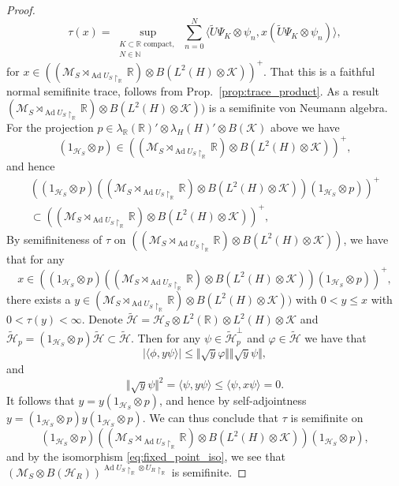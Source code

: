 \documentclass[sn-mathphys-num]{sn-jnl}%
\newcommand{\RR}{\mathbb{R}}
\newcommand{\HH}{\mathcal{H}}
\newcommand{\KK}{\mathcal{K}}
\newcommand{\MM}{\mathcal{M}}
\DeclareMathOperator{\Ad}{Ad}
\numberwithin{equation}{section}
\theoremstyle{thmstyleone}%
\theoremstyle{thmstyletwo}%
\theoremstyle{thmstylethree}%
\begin{document}
\begin{proof}
    \begin{equation}
        \tau(x)=\sup_{\substack{K\subset\RR\text{ compact, }\\N\in\mathbb{N}}}\sum_{n=0}^N\langle \tilde{U}\Psi_K\otimes\psi_n,x(\tilde{U}\Psi_K\otimes\psi_n)\rangle,
    \end{equation}
    for $x\in ((\MM_S\rtimes_{\Ad U_S\restriction_\RR}\RR)\otimes B(L^2(H)\otimes\KK))^+$. That this is a faithful normal semifinite trace, follows from Prop.\ \ref{prop:trace_product}. As a result $(\MM_S\rtimes_{\Ad U_S\restriction_\RR}\RR)\otimes B(L^2(H)\otimes\KK))$ is a semifinite von Neumann algebra. For the projection $p\in \lambda_\RR(\RR)'\otimes\lambda_H(H)'\otimes B(\KK)$ above we have 
    \begin{equation}
        (1_{\HH_S}\otimes p)\in ((\MM_S\rtimes_{\Ad U_S\restriction_\RR}\RR)\otimes B(L^2(H)\otimes\KK))^+,
    \end{equation}
    and hence
    \begin{multline}
    \label{eq:compression_positive}
        \left((1_{\HH_S}\otimes p)((\MM_S\rtimes_{\Ad U_S\restriction_\RR}\RR)\otimes B(L^2(H)\otimes\KK))(1_{\HH_S}\otimes p)\right)^+\\
        \subset ((\MM_S\rtimes_{\Ad U_S\restriction_\RR}\RR)\otimes B(L^2(H)\otimes\KK))^+,
    \end{multline}
    By semifiniteness of $\tau$ on $((\MM_S\rtimes_{\Ad U_S\restriction_\RR}\RR)\otimes B(L^2(H)\otimes\KK))$, we have that for any
    \begin{equation}
        x\in \left((1_{\HH_S}\otimes p)((\MM_S\rtimes_{\Ad U_S\restriction_\RR}\RR)\otimes B(L^2(H)\otimes\KK))(1_{\HH_S}\otimes p)\right)^+,
    \end{equation}
    there exists a $y\in (\MM_S\rtimes_{\Ad U_S\restriction_\RR}\RR)\otimes B(L^2(H)\otimes\KK))$ with $0<y\leq x$ with $0<\tau(y)<\infty$. Denote $\tilde{\HH}=\HH_S\otimes L^2(\RR)\otimes L^2(H)\otimes\KK$ and $\tilde{\HH}_p=(1_{\HH_S}\otimes p)\tilde{\HH}\subset \tilde{\HH}$. Then for any $\psi\in\tilde{\HH}_p^\perp$ and $\varphi\in\tilde{\HH}$ we have that
    \begin{equation}
        \vert\langle \phi,y\psi\rangle\vert\leq \Vert \sqrt{y}\varphi\Vert\Vert \sqrt{y}\psi\Vert,
    \end{equation}
    and 
    \begin{equation}
        \Vert \sqrt{y}\psi\Vert^2=\langle\psi,y\psi\rangle\leq \langle \psi,x\psi\rangle=0.
    \end{equation}
    It follows that $y=y(1_{\HH_S}\otimes p)$, and hence by self-adjointness $y=(1_{\HH_S}\otimes p)y(1_{\HH_S}\otimes p)$. We can thus conclude that $\tau$ is semifinite on 
    \begin{equation}
        (1_{\HH_S}\otimes p)((\MM_S\rtimes_{\Ad U_S\restriction_\RR}\RR)\otimes B(L^2(H)\otimes\KK))(1_{\HH_S}\otimes p),
    \end{equation}
    and by the isomorphism \eqref{eq:fixed_point_iso}, we see that $(\MM_S\otimes B(\HH_R))^{\Ad U_S\restriction_\RR\otimes U_R\restriction_\RR}$ is semifinite.


\end{proof}
\end{document}
